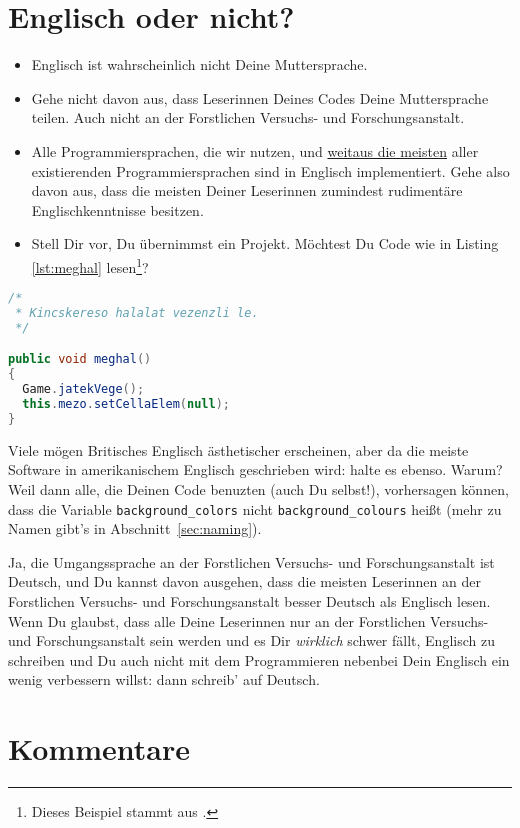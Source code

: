\documentclass[twoside]{scrreprt}
\providecommand{\code}[1]{\texttt{#1}}
\providecommand{\FVA}[1]{Forstliche#1 Versuchs- und Forschungsanstalt}
\begin{document}
\section{Englisch oder nicht?}
\begin{itemize}
\item Englisch ist wahrscheinlich nicht Deine Muttersprache.
\end{itemize}
\begin{itemize}
\item Gehe nicht davon aus, dass Leserinnen Deines Codes Deine
    Muttersprache teilen. Auch nicht an der \FVA{n}.
\item Alle Programmiersprachen, die wir nutzen, und
  \href{http://en.wikipedia.org/wiki/Non-English-based_programming_languages}
  {weitaus die meisten}
  aller existierenden Programmiersprachen sind in Englisch implementiert.
  Gehe also davon aus, dass die meisten Deiner Leserinnen zumindest 
  rudiment\"a{}re Englischkenntnisse besitzen.
\item Stell Dir vor, Du \"u{}bernimmst ein Projekt. M\"o{}chtest Du Code wie
    in Listing \ref{lst:meghal}
    lesen\footnote{Dieses Beispiel stammt aus \cite{wsp}.}?
\end{itemize}
\begin{lstlisting}[float=h, label=lst:meghal, language=Java]
/*
 * Kincskereso halalat vezenzli le.
 */

public void meghal()
{
  Game.jatekVege();
  this.mezo.setCellaElem(null);
}
\end{lstlisting}

 Viele m\"o{}gen Britisches Englisch \"a{}sthetischer
erscheinen, aber da die meiste Software in amerikanischem Englisch geschrieben
wird: halte es ebenso. Warum? Weil dann alle, die Deinen Code benuzten
(auch Du selbst!), vorhersagen k\"o{}nnen, dass die Variable
\code{background\_colors} nicht \code{background\_colours} hei\ss{}t (mehr zu
Namen gibt's in Abschnitt~\ref{sec:naming}).

 Ja, die Umgangssprache an der \FVA{n} ist Deutsch, und Du
kannst davon ausgehen, dass die meisten Leserinnen an der \FVA{n} besser Deutsch
als Englisch lesen. Wenn Du glaubst, dass alle Deine Leserinnen nur an der
\FVA{n} sein werden und es Dir \emph{wirklich} schwer f\"a{}llt, Englisch zu
schreiben und Du auch nicht mit dem Programmieren nebenbei Dein Englisch ein
wenig verbessern willst: dann schreib' auf Deutsch.

\section{Kommentare}
\end{document}
